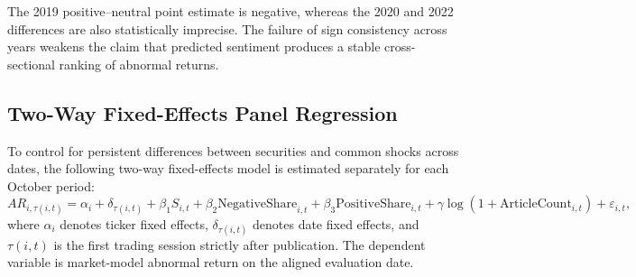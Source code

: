 \documentclass[12pt,a4paper]{article}
\begin{document}
The 2019 positive--neutral point estimate is negative, whereas the 2020 and 2022 differences are also statistically imprecise. The failure of sign consistency across years weakens the claim that predicted sentiment produces a stable cross-sectional ranking of abnormal returns.



\subsection{Two-Way Fixed-Effects Panel Regression}
\label{subsec:panel-regression-multi-year}

To control for persistent differences between securities and common shocks across dates, the following two-way fixed-effects model is estimated separately for each October period:
\begin{equation}
 AR_{i,\tau(i,t)}=\alpha_i+\delta_{\tau(i,t)}+\beta_1S_{i,t}
 +\beta_2\mathrm{NegativeShare}_{i,t}
 +\beta_3\mathrm{PositiveShare}_{i,t}
 +\gamma\log(1+\mathrm{ArticleCount}_{i,t})+\varepsilon_{i,t},
\end{equation}
where $\alpha_i$ denotes ticker fixed effects, $\delta_{\tau(i,t)}$ denotes date fixed effects, and $\tau(i,t)$ is the first trading session strictly after publication. The dependent variable is market-model abnormal return on the aligned evaluation date.
\end{document}
